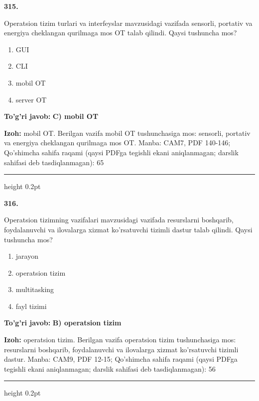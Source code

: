 \documentclass[10pt,a4paper]{article}
\begin{document}
{\bfseries\sffamily\color{ink} 315.}
\par
Operatsion tizim turlari va interfeyslar mavzusidagi vazifada sensorli, portativ va energiya cheklangan qurilmaga mos OT talab qilindi. Qaysi tushuncha mos?
\begin{enumerate}[label=\Alph*),leftmargin=9mm]
\item GUI
\item CLI
\item mobil OT
\item server OT
\end{enumerate}
\begin{tcolorbox}[enhanced,breakable,colback=teal!4,colframe=teal!60!black,boxrule=0.45pt,arc=1.2mm,left=2.7mm,right=2.7mm,top=1.8mm,bottom=1.8mm,before skip=2mm,after skip=2mm]
{\bfseries\sffamily\color{teal}To'g'ri javob:} \textbf{C) mobil OT}
\par\smallskip
{\bfseries Izoh:} mobil OT. Berilgan vazifa mobil OT tushunchasiga mos: sensorli, portativ va energiya cheklangan qurilmaga mos OT. Manba: CAM7, PDF 140-146; Qo'shimcha sahifa raqami (qaysi PDFga tegishli ekani aniqlanmagan; darslik sahifasi deb tasdiqlanmagan): 65
\end{tcolorbox}
\vspace{2mm}\hrule height 0.2pt\vspace{3mm}

{\bfseries\sffamily\color{ink} 316.}
\par
Operatsion tizimning vazifalari mavzusidagi vazifada resurslarni boshqarib, foydalanuvchi va ilovalarga xizmat ko'rsatuvchi tizimli dastur talab qilindi. Qaysi tushuncha mos?
\begin{enumerate}[label=\Alph*),leftmargin=9mm]
\item jarayon
\item operatsion tizim
\item multitasking
\item fayl tizimi
\end{enumerate}
\begin{tcolorbox}[enhanced,breakable,colback=teal!4,colframe=teal!60!black,boxrule=0.45pt,arc=1.2mm,left=2.7mm,right=2.7mm,top=1.8mm,bottom=1.8mm,before skip=2mm,after skip=2mm]
{\bfseries\sffamily\color{teal}To'g'ri javob:} \textbf{B) operatsion tizim}
\par\smallskip
{\bfseries Izoh:} operatsion tizim. Berilgan vazifa operatsion tizim tushunchasiga mos: resurslarni boshqarib, foydalanuvchi va ilovalarga xizmat ko'rsatuvchi tizimli dastur. Manba: CAM9, PDF 12-15; Qo'shimcha sahifa raqami (qaysi PDFga tegishli ekani aniqlanmagan; darslik sahifasi deb tasdiqlanmagan): 56
\end{tcolorbox}
\vspace{2mm}\hrule height 0.2pt\vspace{3mm}
\end{document}
